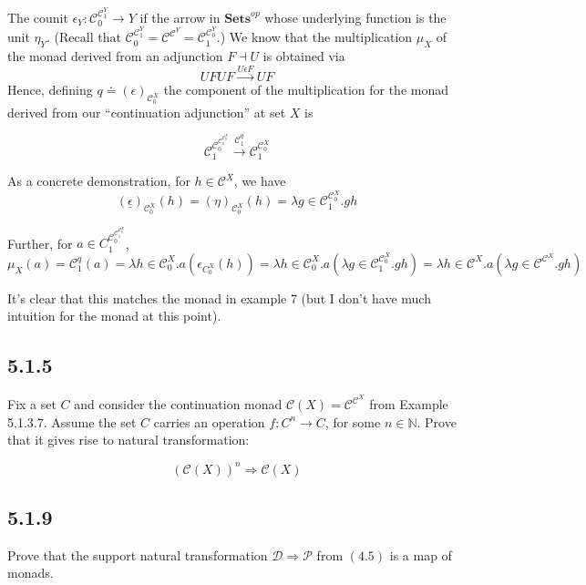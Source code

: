 \documentclass{article}
\newcommand{\mbf}{\mathbf}
\begin{document}
The counit $\epsilon_Y : \mathcal C_0^{\mathcal C_1^Y} \to Y$ if the arrow in $\mbf{Sets}^{op}$ whose underlying function is the unit $\eta_Y$. (Recall that $\mathcal C_0^{\mathcal C_1^Y} = \mathcal C^{\mathcal C^Y} = \mathcal C_1^{\mathcal C_0^Y}$.) We know that the 
multiplication $\mu_X$ of the monad derived from an adjunction $F \dashv U$ is obtained via
$$UFUF \overset{U \epsilon F}{\longrightarrow} UF$$
Hence, defining $q \doteq (\epsilon)_{\mathcal C_0^X}$ the component of the multiplication for the monad derived from our ``continuation adjunction'' at set $X$ is

$$\mathcal C_1^{\mathcal C_0^{\mathcal C_1^{\mathcal C_0^X}}} \overset{\mathcal C_1^{q}}{\longrightarrow} \mathcal C_1^{\mathcal C_0^X}$$

As a concrete demonstration, for $h \in \mathcal C^X$, we have 
$$(\underline{\epsilon})_{\mathcal C_0^X}(h) = (\eta)_{\mathcal C_0^X}(h) = \lambda g \in \mathcal C_1^{\mathcal C_0^{X}}. gh 
 $$

Further, for $a \in C_1^{\mathcal C_0^{\mathcal C_1^{\mathcal C_0^X}}}$, 
$$\mu_X(a) = \mathcal C_1^q(a) = \lambda h \in \mathcal C_0^X. a (\epsilon_{C_0^X}(h)) = \lambda h \in \mathcal C_0^X. 
a (\lambda g \in \mathcal C_1^{\mathcal C_0^X}. gh) = \lambda h \in \mathcal C^X. 
a (\lambda g \in \mathcal C^{\mathcal C^X}. gh)   $$

It's clear that this matches the monad in example 7 (but I don't have much intuition for the monad at this point).



\subsection*{5.1.5}

Fix a set $C$ and consider the continuation monad $\mathcal C(X) = \mathcal C^{\mathcal C^X}$ from Example 5.1.3.7.
Assume the set $C$ carries an operation $f : C^n \to C$, for some $n \in \mathbb N$. Prove that it gives rise to natural
transformation:

$$(\mathcal C(X))^n \Longrightarrow \mathcal C(X)$$

\subsection*{5.1.9}

Prove that the support natural transformation $\mathcal D \Rightarrow \mathcal P$ from $(4.5)$ is a map of monads.\\~\\
\end{document}
